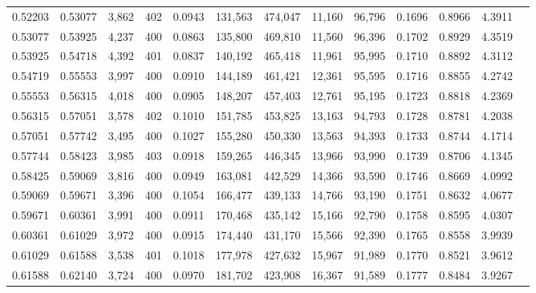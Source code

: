 \begin{tabular}{rrrrrrrrrrrrr}
0.52203 & 0.53077 & 3,862 & 402 &                                     0.0943 & 131,563 & 474,047 &  11,160 &  96,796 & 0.1696 & 0.8966 & 4.3911 \\
0.53077 & 0.53925 & 4,237 & 400 &                                     0.0863 & 135,800 & 469,810 &  11,560 &  96,396 & 0.1702 & 0.8929 & 4.3519 \\
0.53925 & 0.54718 & 4,392 & 401 &                                     0.0837 & 140,192 & 465,418 &  11,961 &  95,995 & 0.1710 & 0.8892 & 4.3112 \\
0.54719 & 0.55553 & 3,997 & 400 &                                     0.0910 & 144,189 & 461,421 &  12,361 &  95,595 & 0.1716 & 0.8855 & 4.2742 \\
0.55553 & 0.56315 & 4,018 & 400 &                                     0.0905 & 148,207 & 457,403 &  12,761 &  95,195 & 0.1723 & 0.8818 & 4.2369 \\
0.56315 & 0.57051 & 3,578 & 402 &                                     0.1010 & 151,785 & 453,825 &  13,163 &  94,793 & 0.1728 & 0.8781 & 4.2038 \\
0.57051 & 0.57742 & 3,495 & 400 &                                     0.1027 & 155,280 & 450,330 &  13,563 &  94,393 & 0.1733 & 0.8744 & 4.1714 \\
0.57744 & 0.58423 & 3,985 & 403 &                                     0.0918 & 159,265 & 446,345 &  13,966 &  93,990 & 0.1739 & 0.8706 & 4.1345 \\
0.58425 & 0.59069 & 3,816 & 400 &                                     0.0949 & 163,081 & 442,529 &  14,366 &  93,590 & 0.1746 & 0.8669 & 4.0992 \\
0.59069 & 0.59671 & 3,396 & 400 &                                     0.1054 & 166,477 & 439,133 &  14,766 &  93,190 & 0.1751 & 0.8632 & 4.0677 \\
0.59671 & 0.60361 & 3,991 & 400 &                                     0.0911 & 170,468 & 435,142 &  15,166 &  92,790 & 0.1758 & 0.8595 & 4.0307 \\
0.60361 & 0.61029 & 3,972 & 400 &                                     0.0915 & 174,440 & 431,170 &  15,566 &  92,390 & 0.1765 & 0.8558 & 3.9939 \\
0.61029 & 0.61588 & 3,538 & 401 &                                     0.1018 & 177,978 & 427,632 &  15,967 &  91,989 & 0.1770 & 0.8521 & 3.9612 \\
0.61588 & 0.62140 & 3,724 & 400 &                                     0.0970 & 181,702 & 423,908 &  16,367 &  91,589 & 0.1777 & 0.8484 & 3.9267 \\

\end{tabular}
